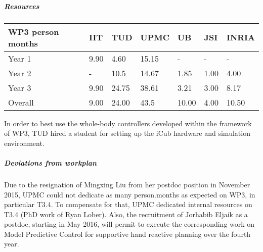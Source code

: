 
\subparagraph*{Resources}

\begin{center}
\begin{tabular}{|C{1.5cm}|C{1.5cm}|C{1.5cm}|C{2cm}|C{2cm}|C{2cm}|C{2cm}|}
\hline
\footnotesize \textbf{WP3 person months} & \footnotesize \textbf{IIT}&\footnotesize \textbf{TUD}&\footnotesize \textbf{UPMC}& \footnotesize \textbf{UB} &\footnotesize \textbf{JSI} &\footnotesize \textbf{INRIA} \\ \hline
\footnotesize Year 1 &  9.90 & 4.60 & 15.15 & - & - &  -   \\  \hline
\footnotesize Year 2 &  - & 10.5 & 14.67 & 1.85 & 1.00 &  4.00  \\  \hline
\footnotesize Year 3 &  9.90 & 24.75 & 38.61 & 3.21 & 3.00 & 8.17\\  
\hline \hline
\footnotesize Overall &  9.00 & 24.00 & 43.5 & 10.00 & 4.00 & 10.50 \\ \hline
\end{tabular}
\end{center}

In order to best use the whole-body controllers developed within the framework of WP3, TUD hired a student for setting up the iCub hardware and simulation environment.

\subparagraph*{Deviations from workplan}

Due to the resignation of Mingxing Liu from her postdoc position in November 2015, UPMC could not dedicate as many person.months as expected on WP3, in particular T3.4. To compensate for that, UPMC dedicated internal resources on T3.4 (PhD work of Ryan Lober). Also, the recruitment of Jorhabib Eljaik as a postdoc, starting in May 2016, will permit to execute the corresponding work on Model Predictive Control for supportive hand reactive planning over the fourth year. 



